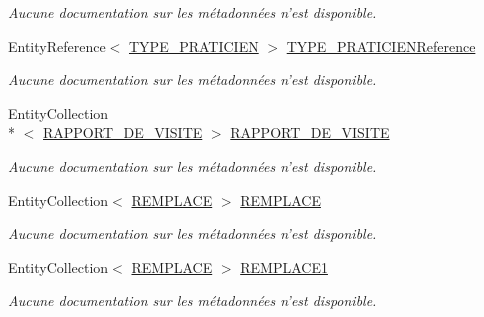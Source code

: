 \begin{DoxyCompactItemize}
\begin{DoxyCompactList}\small\item\em Aucune documentation sur les métadonnées n'est disponible. \end{DoxyCompactList}\item 
Entity\-Reference$<$ \hyperlink{class_model_1_1_t_y_p_e___p_r_a_t_i_c_i_e_n}{T\-Y\-P\-E\-\_\-\-P\-R\-A\-T\-I\-C\-I\-E\-N} $>$ \hyperlink{class_model_1_1_p_r_a_t_i_c_i_e_n_a3bc7693b4b3965bf78d0685094994c1e}{T\-Y\-P\-E\-\_\-\-P\-R\-A\-T\-I\-C\-I\-E\-N\-Reference}
\begin{DoxyCompactList}\small\item\em Aucune documentation sur les métadonnées n'est disponible. \end{DoxyCompactList}\item 
Entity\-Collection\\*
$<$ \hyperlink{class_model_1_1_r_a_p_p_o_r_t___d_e___v_i_s_i_t_e}{R\-A\-P\-P\-O\-R\-T\-\_\-\-D\-E\-\_\-\-V\-I\-S\-I\-T\-E} $>$ \hyperlink{class_model_1_1_p_r_a_t_i_c_i_e_n_a75d092c7410cd4c92c2aee3d4cf884a6}{R\-A\-P\-P\-O\-R\-T\-\_\-\-D\-E\-\_\-\-V\-I\-S\-I\-T\-E}
\begin{DoxyCompactList}\small\item\em Aucune documentation sur les métadonnées n'est disponible. \end{DoxyCompactList}\item 
Entity\-Collection$<$ \hyperlink{class_model_1_1_r_e_m_p_l_a_c_e}{R\-E\-M\-P\-L\-A\-C\-E} $>$ \hyperlink{class_model_1_1_p_r_a_t_i_c_i_e_n_a8ba2a460b9a92f0d33ebeb34a4fa6064}{R\-E\-M\-P\-L\-A\-C\-E}
\begin{DoxyCompactList}\small\item\em Aucune documentation sur les métadonnées n'est disponible. \end{DoxyCompactList}\item 
Entity\-Collection$<$ \hyperlink{class_model_1_1_r_e_m_p_l_a_c_e}{R\-E\-M\-P\-L\-A\-C\-E} $>$ \hyperlink{class_model_1_1_p_r_a_t_i_c_i_e_n_a3f3d71a138657c92174f6452aa7e6a31}{R\-E\-M\-P\-L\-A\-C\-E1}
\begin{DoxyCompactList}\small\item\em Aucune documentation sur les métadonnées n'est disponible. \end{DoxyCompactList}\item 

\end{DoxyCompactItemize}
